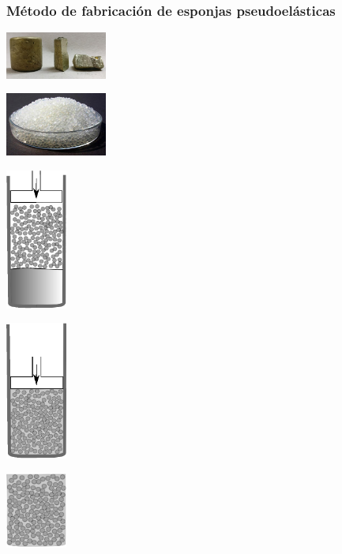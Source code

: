\documentclass[usenames,dvipsnames]{beamer}
\begin{document}
\begin{frame}
\frametitle{Método de fabricación de esponjas pseudoelásticas}
\begin{center}
\begin{multicols}{4}
\includegraphics[width=0.25\textwidth]{img/proceso/lingote.jpg}



\includegraphics[width=0.25\textwidth]{img/proceso/silica.jpg}


\includegraphics[width=0.15\textwidth]{img/proceso/proceso1.eps}


\includegraphics[width=0.15\textwidth]{img/proceso/proceso2.eps}
\vfill

\includegraphics[width=0.15\textwidth]{img/proceso/proceso3.eps}
\end{multicols}


\end{center}
\end{frame}
\end{document}
